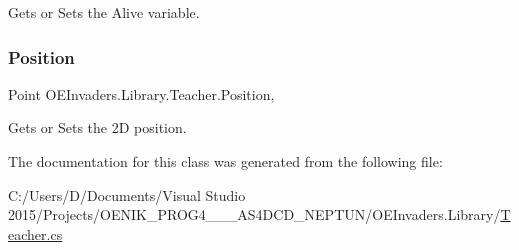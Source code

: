 Gets or Sets the Alive variable. 

\mbox{\label{class_o_e_invaders_1_1_library_1_1_teacher_aaddeab5618249c9a99388d5f2942c6b1}} 
\subsubsection{\texorpdfstring{Position}{Position}}
{\footnotesize\ttfamily Point O\+E\+Invaders.\+Library.\+Teacher.\+Position\hspace{0.3cm}{\ttfamily [get]}, {\ttfamily [set]}}



Gets or Sets the 2D position. 



The documentation for this class was generated from the following file\+:\begin{DoxyCompactItemize}
\item 
C\+:/\+Users/\+D/\+Documents/\+Visual Studio 2015/\+Projects/\+O\+E\+N\+I\+K\+\_\+\+P\+R\+O\+G4\+\_\+\_\+\_\+\+A\+S4\+D\+C\+D\+\_\+\+N\+E\+P\+T\+U\+N/\+O\+E\+Invaders.\+Library/\mbox{\hyperlink{_teacher_8cs}{Teacher.\+cs}}\end{DoxyCompactItemize}
